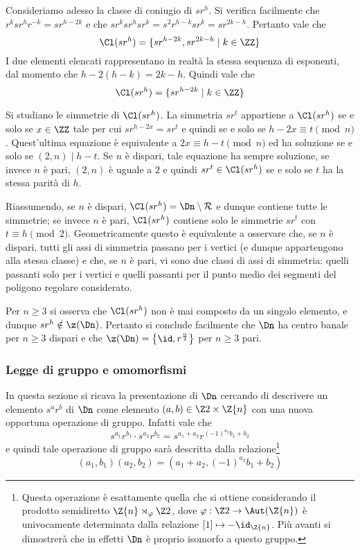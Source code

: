 \documentclass[11pt]{scrartcl}
\begin{document}
	Consideriamo adesso la classe di coniugio di $sr^h$. Si verifica facilmente
	che $r^k sr^h r^{-k} = s r^{h-2k}$ e che $sr^k sr^h sr^k = s^2 r^{h-k} sr^k =
	s r^{2k-h}$. Pertanto vale che
	\[ \Cl(sr^h) = \{ sr^{h-2k}, sr^{2k-h} \mid k \in \ZZ \} \]
	I due elementi elencati rappresentano in realtà la stessa sequenza di
	esponenti, dal momento che $h - 2(h-k) = 2k-h$. Quindi vale
	che
	\[ \Cl(sr^h) = \{ sr^{h-2k} \mid k \in \ZZ \} \]
	
	
	\begin{remark}
		Si studiano le simmetrie di $\Cl(sr^h)$. La simmetria $sr^t$ appartiene a
		$\Cl(sr^h)$ se e solo se $x \in \ZZ$ tale per cui $sr^{h-2x} = sr^t$
		e quindi se e solo se $h-2x \equiv t \pmod n$. Quest'ultima equazione
		è equivalente a $2x \equiv h-t \pmod n$ ed ha soluzione se e solo se
		$(2, n) \mid h-t$. Se $n$ è dispari, tale equazione ha sempre soluzione,
		se invece $n$ è pari, $(2, n)$ è uguale a $2$ e quindi $sr^t \in \Cl(sr^h)$
		se e solo se $t$ ha la stessa parità di $h$. \medskip
		
		Riassumendo, se $n$ è dispari, $\Cl(sr^h) = \Dn \setminus \mathcal{R}$ e
		dunque contiene tutte le simmetrie; se invece $n$ è pari, $\Cl(sr^h)$ contiene
		solo le simmetrie $sr^t$ con $t \equiv h \pmod 2$. Geometricamente questo
		è equivalente a osservare che, se $n$ è dispari, tutti gli assi di simmetria
		passano per i vertici (e dunque appartengono alla stessa classe) e che, se $n$
		è pari, vi sono due classi di assi di simmetria: quelli passanti solo per i vertici e
		quelli passanti per il punto medio dei segmenti del poligono regolare considerato.
	\end{remark}
	
	\begin{remark}
		Per $n \geq 3$ si osserva che $\Cl(sr^h)$ non è mai composto da un singolo elemento, e dunque
		$sr^h \notin \z(\Dn)$. Pertanto si conclude facilmente che $\Dn$ ha centro banale
		per $n \geq 3$ dispari e che $\z(\Dn) = \left\{ \id, r^{\frac{n}{2}} \right\}$ per $n \geq 3$
		pari.
	\end{remark}
	
	
	\subsubsection{Legge di gruppo e omomorfismi}
	
	In questa sezione si ricava la presentazione di $\Dn$ cercando di descrivere
	un elemento $s^a r^b$ di $\Dn$ come elemento $(a, b) \in \Z2 \times \Z{n}$ con
	una nuova opportuna operazione di gruppo. Infatti vale che
	\[ s^{a_1} r^{b_1} \cdot s^{a_2} r^{b_2} = s^{a_1 + a_2} r^{(-1)^{a_2} b_1 + b_2} \]
	e quindi tale operazione di gruppo sarà descritta dalla relazione\footnote{
		Questa operazione è esattamente quella che si ottiene considerando il
		prodotto semidiretto
		$\Z{n} \rtimes_\varphi \Z2$, dove $\varphi : \Z2 \to \Aut(\Z{n})$ è univocamente
		determinata dalla relazione $[1] \mapsto -\id_{\Z{n}}$. Più avanti si dimostrerà
		che in effetti $\Dn$ è proprio isomorfo a questo gruppo.
	}
	\[ (a_1, b_1) (a_2, b_2) = (a_1 + a_2, (-1)^{a_2} b_1 + b_2) \]
\end{document}
